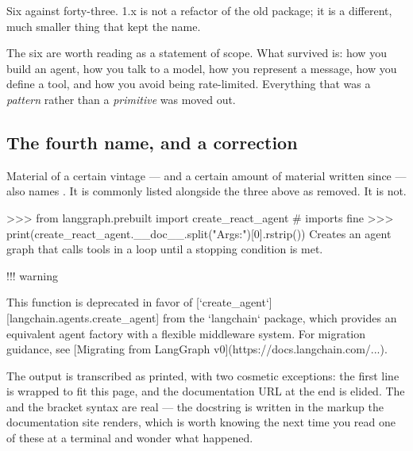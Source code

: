 Six against forty-three.  1.x is not a refactor of the old
package; it is a different, much smaller thing that kept the name.

\begin{note}
The six are worth reading as a statement of scope. What survived is: how you
build an agent, how you talk to a model, how you represent a message, how you
define a tool, and how you avoid being rate-limited. Everything that was a
\emph{pattern} rather than a \emph{primitive} was moved out.
\end{note}

\subsection{The fourth name, and a correction}
\label{sec:react-agent}

Material of a certain vintage --- and a certain amount of material written since
--- also names . It is commonly
listed alongside the three above as removed. It is not.

\begin{python}[caption={\api{create\_react\_agent} is deprecated, not removed}, label={lst:react-agent}]
>>> from langgraph.prebuilt import create_react_agent   # imports fine
>>> print(create_react_agent.__doc__.split("Args:")[0].rstrip())
Creates an agent graph that calls tools in a loop until a stopping condition
is met.

    !!! warning

        This function is deprecated in favor of
        [`create_agent`][langchain.agents.create_agent] from the `langchain`
        package, which provides an equivalent agent factory with a flexible
        middleware system. For migration guidance, see
        [Migrating from LangGraph v0](https://docs.langchain.com/...).
\end{python}

\noindent
The output is transcribed as printed, with two cosmetic exceptions: the first
line is wrapped to fit this page, and the documentation URL at the end is
elided. The \code{!!!} and the bracket syntax are real --- the docstring is
written in the markup the documentation site renders, which is worth knowing the
next time you read one of these at a terminal and wonder what happened.

